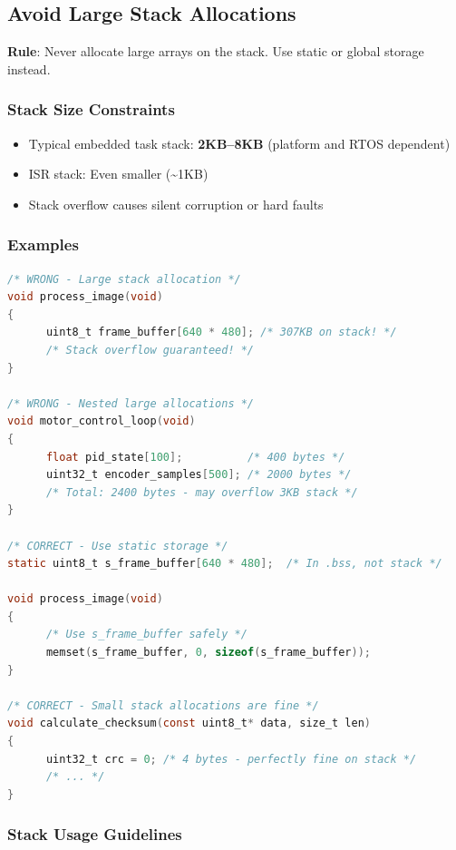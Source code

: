 \subsection{Avoid Large Stack Allocations}

\textbf{Rule}: Never allocate large arrays on the stack. Use static or global storage instead.

\subsubsection{Stack Size Constraints}

\begin{itemize}
\item Typical embedded task stack: \textbf{2KB--8KB} (platform and RTOS dependent)
\item ISR stack: Even smaller (\textasciitilde1KB)
\item Stack overflow causes silent corruption or hard faults
\end{itemize}

\subsubsection{Examples}

\begin{lstlisting}[language=C]
/* WRONG - Large stack allocation */
void process_image(void)
{
      uint8_t frame_buffer[640 * 480]; /* 307KB on stack! */
      /* Stack overflow guaranteed! */
}

/* WRONG - Nested large allocations */
void motor_control_loop(void)
{
      float pid_state[100];          /* 400 bytes */
      uint32_t encoder_samples[500]; /* 2000 bytes */
      /* Total: 2400 bytes - may overflow 3KB stack */
}

/* CORRECT - Use static storage */
static uint8_t s_frame_buffer[640 * 480];  /* In .bss, not stack */

void process_image(void)
{
      /* Use s_frame_buffer safely */
      memset(s_frame_buffer, 0, sizeof(s_frame_buffer));
}

/* CORRECT - Small stack allocations are fine */
void calculate_checksum(const uint8_t* data, size_t len)
{
      uint32_t crc = 0; /* 4 bytes - perfectly fine on stack */
      /* ... */
}


\end{lstlisting}
\subsubsection{Stack Usage Guidelines}

